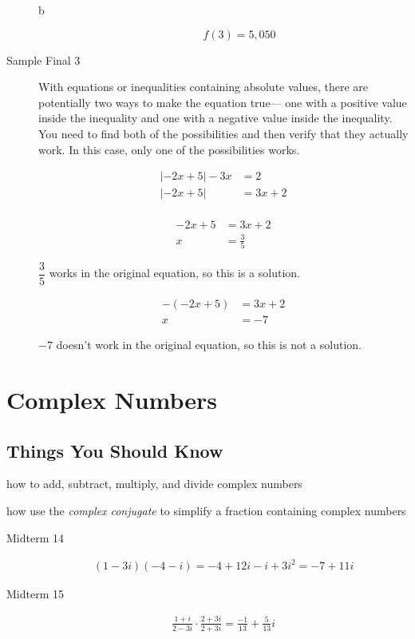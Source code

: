 \documentclass[fleqn,addpoints]{exam}
\begin{document}
\begin{description}
\begin{description}
\item[b]
\[
  f(3) = 5,050
\]

\end{description}

\item[Sample Final 3]
With equations or inequalities containing absolute values, there are potentially two ways to make the equation true---
one with a positive value inside the inequality and one with a negative value inside the inequality.  You need to find
both of the possibilities and then verify that they actually work.  In this case, only one of the possibilities works.

\begin{align*}
  |-2x+5| - 3x &= 2 \\
  |-2x+5| &= 3x + 2 \\
\end{align*}

\begin{align*}
  -2x+5 &= 3x + 2 \\
   x &= \frac{3}{5}
\end{align*}

$\dfrac{3}{5}$ works in the original equation, so this is a solution.

\begin{align*}
  -(-2x+5) &= 3x + 2 \\
   x &= -7
\end{align*}

$-7$ doesn't work in the original equation, so this is not a solution.

\end{description}
 
\section{Complex Numbers}
\subsection{Things You Should Know}
\begin{itemize*}
\item how to add, subtract, multiply, and divide complex numbers
\item how use the {\em complex conjugate}  to simplify a fraction containing complex numbers
\end{itemize*}

\begin{description}
\item[Midterm 14]
\begin{align*}
  (1-3i)(-4-i) = -4 + 12i -i + 3i^2 = -7 + 11i
\end{align*}

\item[Midterm 15]
\begin{align*}
  \frac{1+i}{2-3i} \cdot \frac{2+3i}{2+3i} = \frac{-1}{13} + \frac{5}{13} i
\end{align*}

\end{description}
\end{document}
